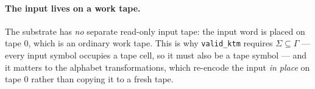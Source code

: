 \paragraph{The input lives on a work tape.}  The substrate has
\emph{no} separate read-only input tape: the input word is placed on
tape $0$, which is an ordinary work tape.  This is why
\texttt{valid\_ktm} requires $\Sigma \subseteq \Gamma$ --- every input
symbol occupies a tape cell, so it must also be a tape symbol --- and it
matters to the alphabet transformations, which re-encode the
input \emph{in place} on tape $0$ rather than copying it to a fresh
tape.
